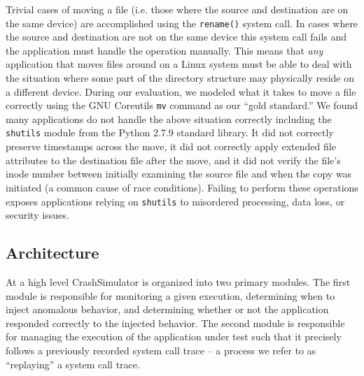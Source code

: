     Trivial cases of moving a file (i.e. those where the source and destination
    are on the same device) are accomplished using the {\tt rename()} system
    call.  In cases where the source and destination are not on the same device
    this system call fails and the application must handle the operation
    manually. This means that \emph{any} application that moves files around on
    a Linux system must be able to deal with the situation where some part of
    the directory structure may physically reside on a different device.
    During our evaluation, we modeled what
    it takes to move a file correctly using the GNU Coreutils {\tt mv} command
    as our ``gold standard.''  We found many applications do not handle the
    above situation correctly including the {\tt shutils} module from the Python
    2.7.9 standard library.  It did not correctly preserve timestamps across the
    move, it did not correctly apply extended file attributes to the destination
    file after the move, and it did not verify the file's inode number between
    initially examining the source file and when the copy was initiated (a
    common cause of race conditions).  Failing to perform these operations
    exposes applications relying on {\tt shutils} to misordered processing, data
    loss, or security issues.


    \subsection{Architecture}
        
    At a high level CrashSimulator is organized into two primary modules. The
    first module is responsible for monitoring a given execution, determining
    when to inject anomalous behavior, and determining whether or not the
    application responded correctly to the injected behavior. The second module
    is responsible for managing the execution of the application under test such
    that it precisely follows a previously recorded system call trace -- a
    process we refer to as ``replaying'' a system call trace.

